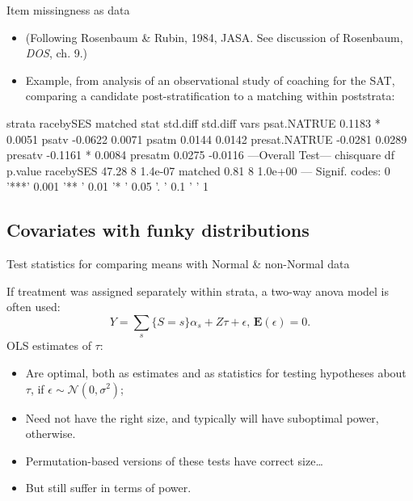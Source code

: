 \begin{frame}[fragile]{Item missingness as data}

  \begin{itemize}
  \item (Following Rosenbaum \& Rubin, 1984, JASA.
See discussion of Rosenbaum, \textit{DOS}, ch. 9.)
  \item Example, from analysis of an observational study of coaching
    for the SAT, comparing a candidate post-stratification to a
    matching within poststrata:
  \end{itemize}

\begin{semiverbatim}
              strata racebySES          matched        
              stat    std.diff         std.diff        
vars                                                   
psat.NATRUE            0.1183  *        0.0051         
psatv                  -0.0622          0.0071         
psatm                  0.0144           0.0142         
presat.NATRUE          -0.0281          0.0289         
presatv                -0.1161 *        0.0084         
presatm                0.0275           -0.0116        
---Overall Test---
          chisquare df p.value
racebySES     47.28  8 1.4e-07
matched        0.81  8 1.0e+00
---
Signif. codes:  0 '***' 0.001 '** ' 0.01 '*  ' 0.05 '.  ' 0.1 '   ' 1     
\end{semiverbatim}

  
\end{frame}

\subsection{Covariates with funky distributions}


\begin{frame}{Test statistics for comparing means with Normal \& non-Normal data}

If treatment was assigned separately within strata, a two-way anova model is often used:
$$
Y = \sum_{s}\{S=s\}\alpha_{s} + Z\tau + \epsilon,\, \mathbf{E}(\epsilon) = 0.
$$
OLS estimates of $\tau$:
\begin{itemize}[<+->]
  \item Are optimal, both as estimates and as statistics for testing hypotheses about $\tau$, if $\epsilon \sim \mathcal{N}(0, \sigma^{2})$;
  \item Need not have the right size, and typically will have suboptimal power, otherwise.
  \item Permutation-based versions of these tests have correct size\ldots
  \item But still suffer in terms of power.
\end{itemize}

\end{frame}


